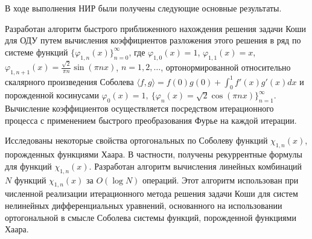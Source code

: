 \Conclusion

В ходе выполнения НИР были получены следующие основные результаты.
%


Разработан алгоритм быстрого приближенного нахождения решения задачи Коши для ОДУ путем вычисления коэффициентов разложения этого решения в ряд по системе функций $\{\varphi_{1,n}(x)\}_{n=0}^{\infty}$, где $ \varphi_{1,0}(x)=1$, $\varphi_{1,1}(x)=x$, $\varphi_{1,n+1}(x)=\frac{\sqrt{2}}{\pi n}\sin(\pi nx)$, $n=1,2,\ldots$,
ортонормированной относительно скалярного произведения Соболева $\langle f, g\rangle=f(0)g(0)+\int_0^1f'(x)g'(x)dx$ и порожденной
косинусами $\varphi_0(x)=1,\ \{\varphi_n(x)=\sqrt{2}\cos(\pi nx)\}_{n=1}^\infty$.
Вычисление коэффициентов осуществляется посредством итерационного процесса с применением быстрого преобразования Фурье на каждой итерации.

Исследованы некоторые свойства ортогональных по Соболеву функций $\chi_{1,n}(x)$, порожденных функциями Хаара. В частности, получены рекуррентные формулы для функций $\chi_{1,n}(x)$. Разработан алгоритм вычисления линейных комбинаций $N$ функций $\chi_{1,n}(x)$ за $O(\log N)$ операций. Этот алгоритм использован при численной реализации итерационного метода решения задачи Коши для систем нелинейных дифференциальных уравнений, основанного на использовании ортогональной в смысле Соболева системы функций, порожденной функциями Хаара.

